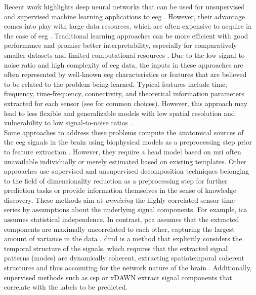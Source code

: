 \noindent Recent work highlights deep neural networks that can be used for unsupervised and supervised machine learning applications to \gls{eeg} \cite{Roy2019}. However, their advantage comes into play with large data resources, which are often expensive to acquire in the case of \gls{eeg} \cite{Banville2021}. Traditional learning approaches can be more efficient with good performance and promise better interpretability, especially for comparatively smaller datasets and limited computational resources \cite{Gemein2020}. Due to the low signal-to-noise ratio and high complexity of \gls{eeg} data, the inputs in these approaches are often represented by well-known \gls{eeg} characteristics or features that are believed to be related to the problem being learned. Typical features include time, frequency, time-frequency, connectivity, and theoretical information parameters extracted for each sensor (see \citeauthor{Gemein2020} \cite{Gemein2020} for common choices). However, this approach may lead to less flexible and generalizable models with low spatial resolution and vulnerability to low signal-to-noise ratios \cite{Saeidi2021}.\\
Some approaches to address these problems compute the anatomical sources of the \gls{eeg} signals in the brain using biophysical models as a preprocessing step prior to feature extraction \cite{Khan2018, Westner2018}. However, they require a head model based on \gls{mri} often unavailable individually or merely estimated based on existing templates. Other approaches use supervised and unsupervised decomposition techniques belonging to the field of dimensionality reduction as a preprocessing step for further prediction tasks or provide information themselves in the sense of knowledge discovery. These methods aim at \textit{unmixing} the highly correlated sensor time series by assumptions about the underlying signal components. For example, \gls{ica} assumes statistical independence. In contrast, \gls{pca} assumes that the extracted components are maximally uncorrelated to each other, capturing the largest amount of variance in the data \cite{CohenX2017}. \Gls{dmd} is a method that explicitly considers the temporal structure of the signals, which requires that the extracted signal patterns (modes) are dynamically coherent, extracting spatiotemporal coherent structures and thus accounting for the network nature of the brain \cite{Brunton2016}. Additionally, supervised methods such as \gls{csp} \cite{Blankertz2008} or xDAWN \cite{Rivet2009} extract signal components that correlate with the labels to be predicted.\\
